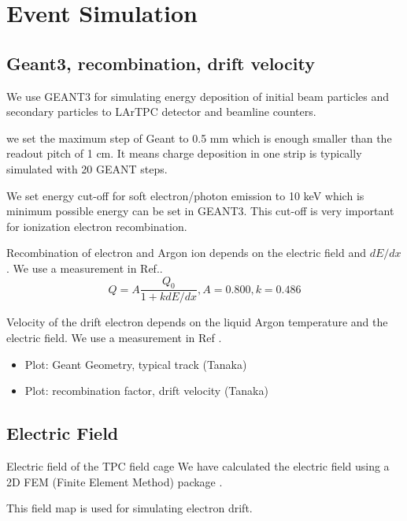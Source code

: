 \section{Event Simulation}
\subsection{Geant3, recombination, drift velocity}

We use GEANT3 for simulating energy deposition of initial beam particles and
secondary particles to LArTPC detector and beamline counters. 

we set the maximum step of Geant to 0.5 mm
which is enough smaller than the readout pitch of 1 cm.
It means charge deposition in one strip is typically 
simulated with 20 GEANT steps.

We set energy cut-off for soft electron/photon emission to
10 keV which is minimum possible energy can be set in GEANT3.
This cut-off is very important for ionization electron recombination.

Recombination of electron and Argon ion depends on
the electric field and $dE/dx$. We use a measurement in Ref.\cite{658352}.
\begin{equation}
Q = A \frac{Q_0}{1 + k dE/dx}, A = 0.800, k = 0.486
\end{equation}

Velocity of the drift electron depends on the liquid Argon temperature
and the electric field. We use a measurement in Ref \cite{649233}.

\begin{itemize}
\item Plot: Geant Geometry, typical track (Tanaka)
\item Plot: recombination factor, drift velocity  (Tanaka)
\end{itemize}

\subsection{Electric Field}

Electric field of the TPC field cage
We have calculated the electric field using a 2D FEM (Finite Element Method) package \cite{Ref:FEMTET}.

This field map is used for simulating electron drift.


